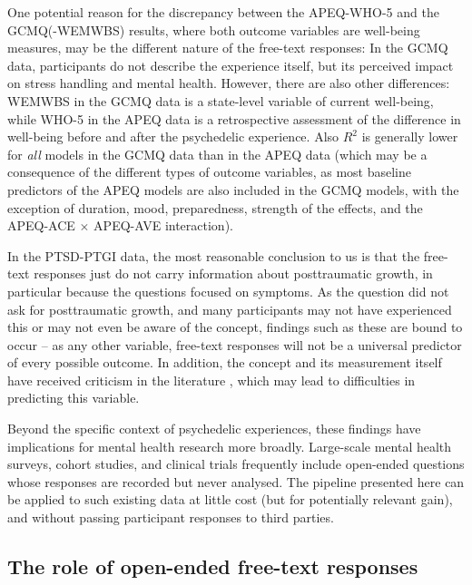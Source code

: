 \documentclass[man,floatsintext]{apa7}
\newcommand{\change}[1]{#1}
\begin{document}
One potential reason for the discrepancy between the APEQ-WHO-5 and the GCMQ(-WEMWBS) results, where both outcome variables are well-being measures, may be the different nature of the free-text responses: In the GCMQ data, participants do not describe the experience itself, but its perceived impact on stress handling and mental health. However, there are also other differences: WEMWBS in the GCMQ data is a state-level variable of current well-being, while WHO-5 in the APEQ data is a retrospective assessment of the difference in well-being before and after the psychedelic experience. Also $R^2$ is generally lower for \emph{all} models in the GCMQ data than in the APEQ data (which may be a consequence of the different types of outcome variables, as \change{most} baseline predictors of the APEQ models are also \change{included} in the GCMQ models\change{, with the exception of duration, mood, preparedness, strength of the effects, and the APEQ-ACE $\times$ APEQ-AVE interaction}).

In the PTSD-PTGI data, the most reasonable conclusion to us is that the free-text responses just do not carry information about posttraumatic growth, \change{in particular because the questions focused on symptoms}. As the question did not ask for posttraumatic growth, and many participants may not have experienced this or may not even be aware of the concept, findings such as these are bound to occur -- as any other variable, free-text responses will not be a universal predictor of every possible outcome. In addition, the concept and its measurement itself have received criticism in the literature \cite{frazier2009does,jayawickreme2021post}, which may lead to difficulties in predicting this variable. 

\change{Beyond the specific context of psychedelic experiences, these findings have implications for mental health research more broadly. Large-scale mental health surveys, cohort studies, and clinical trials frequently include open-ended questions whose responses are recorded but never analysed. The pipeline presented here can be applied to such existing data at little cost (but for potentially relevant gain), and without passing participant responses to third parties. }



\subsection{The role of open-ended free-text responses}
\end{document}
